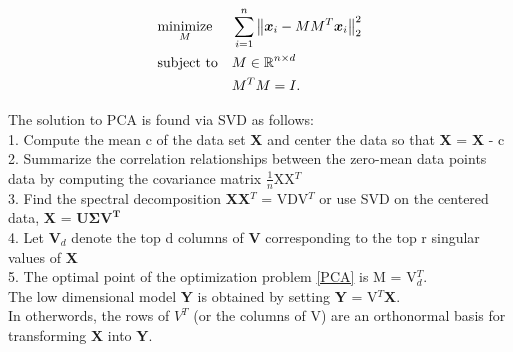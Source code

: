 \begin{equation}\label{PCA}
\begin{aligned}
& \underset{M}{\text{minimize}}
& & \sum_{i=1}^{n} \big \lVert \boldsymbol{x}_{i} - MM^{T}\boldsymbol{x}_{i} \big \rVert_{2}^{2} \\
& \text{subject to}
& & M \in \operatorname{\mathbb{R}}^{n \times d} \\
&&& M^{T}M = I.
\end{aligned}
\end{equation}

The solution  to PCA is found via SVD \cite{Agricultural1938,BishopChristopherM2006Pram, AmericanMathematicalSociety.1939Apat} as follows:\\
1. Compute the mean c of the data set \textbf{X} and center
the data so that \textbf{X} = \textbf{X} - c\\
2. Summarize the correlation relationships between the zero-mean data points  data by computing the covariance matrix $\frac{1}{n}$XX$^{T}$\\
3. Find the spectral decomposition  \textbf{XX}$^{T}$ = VDV$^{T}$ or 
use SVD on the centered data, \textbf{X} = $\bm{U\Sigma V^{T}}$\\
4. Let $\bm{V}_{d}$ denote the top d columns of \textbf{V} corresponding to the  top r singular values of \textbf{X}\\
5. The optimal point of the optimization problem \eqref{PCA} is M = V$_{d}^{T}$.\\
The low dimensional model \textbf{Y} is obtained by setting \textbf{Y} = V$^{T}$\textbf{X}.\\
In otherwords, the rows of $V^{T}$ (or the columns of V) are an orthonormal basis for transforming \textbf{X} into \textbf{Y}.



















